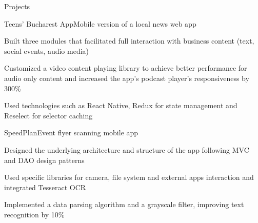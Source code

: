 \documentclass{resume} %
\begin{document}
\begin{rSection}{Projects}

\begin{rSubsection}{Teens' Bucharest App}{Mobile version of a local news web app}{}{}
\item Built three modules that facilitated full interaction with business content (text, social events, audio media)
\item Customized a video content playing library to achieve better performance for audio only content and increased the app's podcast player's responsiveness by 300\%
\item Used technologies such as React Native, Redux for state management and Reselect for selector caching
\end{rSubsection}

\begin{rSubsection}{SpeedPlan}{Event flyer scanning mobile app}{}{}
\item Designed the underlying architecture and structure of the app following MVC and DAO design patterns
\item Used specific libraries for camera, file system and external apps interaction and integrated Tesseract OCR
\item Implemented a data parsing algorithm and a grayscale filter, improving text recognition by 10\%
\end{rSubsection}

\end{rSection}
\end{document}
